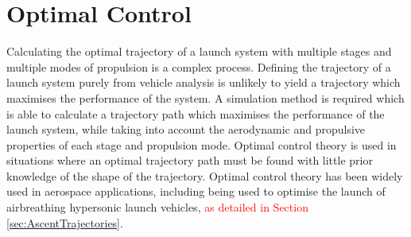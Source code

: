 

\section{Optimal Control}\label{sec:Optimisation}


 Calculating the optimal trajectory of a launch system with multiple stages and multiple modes of propulsion is a complex process. 
 Defining the trajectory of a launch system purely from vehicle analysis is unlikely to yield a trajectory which maximises the performance of the system.
  A simulation method is required which is able to calculate a trajectory path which maximises the performance of the launch system, while taking into account the aerodynamic and propulsive properties of each stage and propulsion mode. 
  Optimal control theory is used in situations where an optimal trajectory path must be found with little prior knowledge of the shape of the trajectory. Optimal control theory has been widely used in aerospace applications, including being used to optimise the launch of airbreathing hypersonic launch vehicles\cite{Powell1991,Lu1993,Trefny1999,Roche2000,Pescetelli2012,Young2006}, \textcolor{red}{as detailed in Section \ref{sec:AscentTrajectories}}.
  
